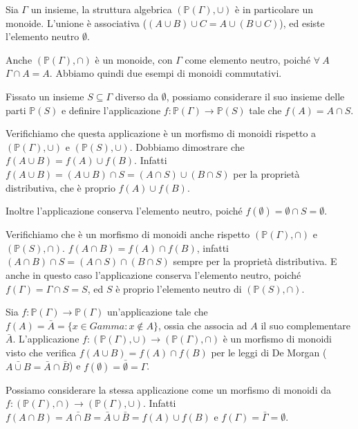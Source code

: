 \begin{exmp}
Sia $\Gamma$ un insieme, la struttura algebrica $(\mathbb{P}(\Gamma), \cup)$ \`e in particolare un monoide. L'unione \`e associativa ($(A \cup B) \cup C = A \cup (B \cup C)$), ed esiste l'elemento neutro $\emptyset$.

Anche $(\mathbb{P}(\Gamma), \cap)$ \`e un monoide, con $\Gamma$ come elemento neutro, poich\'e $\forall \ A$ $\Gamma \cap A = A$. Abbiamo quindi due esempi di monoidi commutativi.

Fissato un insieme $S \subseteq \Gamma$ diverso da $\emptyset$, possiamo considerare il suo insieme delle parti $\mathbb{P}(S)$ e definire l'applicazione $f : \mathbb{P}(\Gamma) \to \mathbb{P}(S)$ tale che $f(A) = A \cap S$. 

Verifichiamo che questa applicazione \`e un morfismo di monoidi rispetto a $(\mathbb{P}(\Gamma), \cup)$ e $(\mathbb{P}(S), \cup)$. Dobbiamo dimostrare che $f( A \cup B) = f(A) \cup f(B)$. Infatti $f(A \cup B) = (A \cup B) \cap S = (A \cap S) \cup (B \cap S)$ per la propriet\`a distributiva, che \`e proprio $f(A) \cup f(B)$.

Inoltre l'applicazione conserva l'elemento neutro, poich\'e $f(\emptyset) = \emptyset \cap S = \emptyset$.

Verifichiamo che \`e un morfismo di monoidi anche rispetto $(\mathbb{P}(\Gamma), \cap)$ e $(\mathbb{P}(S), \cap)$. $f(A \cap B) = f(A) \cap f(B)$, infatti $(A \cap B) \cap S = (A \cap S) \cap (B \cap S)$ sempre per la propriet\`a distributiva. E anche in questo caso l'applicazione conserva l'elemento neutro, poich\'e $f(\Gamma) = \Gamma \cap S = S$, ed $S$ \`e proprio l'elemento neutro di $(\mathbb{P}(S), \cap)$.
\end{exmp}

\begin{exmp}
Sia $f : \mathbb{P}(\Gamma) \to \mathbb{P}(\Gamma)$ un'applicazione tale che $f(A) = \bar A = \{ x \in Gamma : x \notin A\}$, ossia che associa ad $A$ il suo complementare $\bar A$. L'applicazione $f : (\mathbb{P}(\Gamma), \cup) \to (\mathbb{P}(\Gamma), \cap)$ \`e un morfismo di monoidi visto che verifica $f(A \cup B) = f(A) \cap f(B)$ per le leggi di De Morgan ($\bar{A \cup B} = \bar A \cap \bar B$) e $f(\emptyset) = \bar \emptyset = \Gamma$.

Possiamo considerare la stessa applicazione come un morfismo di monoidi da $f : (\mathbb{P}(\Gamma), \cap) \to (\mathbb{P}(\Gamma), \cup)$. Infatti $f(A \cap B) = \bar{A \cap B} = \bar A \cup \bar B = f(A) \cup f(B)$ e $f(\Gamma) = \bar \Gamma = \emptyset$.
\end{exmp}

